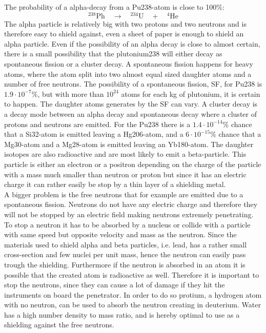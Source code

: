 The probability of a alpha-decay from a Pu238-atom is close to 100\%: 
\begin{equation}
^{238}\text{Ph} \quad \rightarrow \quad ^{234}\text{U} \quad + \quad ^4 \text{He}
\end{equation}
The alpha particle is relatively big with two protons and two neutrons and is therefore easy to shield against, even a sheet of paper is enough to shield an alpha particle\cite{website:shielding}. Even if the possibility of an alpha decay is close to almost certain, there is a small possibility that the plutonium238 will either decay as spontaneous fission or a cluster decay\cite{website:plutonium}. A spontaneous fission happens for heavy atoms, where the atom split into two almost equal sized daughter atoms and a number of free neutrons\cite{website:spontaneous_fission}. The possibility of a spontaneous fission, SF, for Pu238 is $1.9 \cdot 10^{-7}\%$, but with more than $10^{24}$ atoms for each kg of plutonium, it is certain to happen. The daughter atoms generates by the SF can vary. A cluster decay is a decay mode between an alpha decay and spontaneous decay where a cluster of protons and neutrons are emitted. For the Pu238 there is a $1.4 \cdot 10^{-14}\%$ chance that a Si32-atom is emitted leaving a Hg206-atom, and a $6 \cdot 10^{-15}\%$ chance that a Mg30-atom and a Mg28-atom is emitted leaving an Yb180-atom. The daughter isotopes are also radioactive and are most likely to emit a beta-particle. This particle is either an electron or a positron depending on the charge of the particle with a mass much smaller than neutron or proton but since it has an electric charge it can rather easily be stop by a thin layer of a shielding metal. \\

\noindent
A bigger problem is the free neutrons that for example are emitted due to a spontaneous fission.  Neutrons do not have any electric charge and therefore they will not be stopped by an electric field making neutrons extremely penetrating. To stop a neutron it has to be absorbed by a nucleus or collide with a particle with same speed but opposite velocity and mass as the neutron. Since the materials used to shield alpha and beta particles, i.e. lead, has a rather small cross-section and few nuclei per unit mass, hence the neutron can easily pass trough the shielding. Furthermore if the neutron is absorbed in an atom it is possible that the created atom is radioactive as well. Therefore it is important to stop the neutrons, since they can cause a lot of damage if they hit the instruments on board the penetrator. In order to do so protium, a hydrogen atom with no neutron, can be used to absorb the neutron creating in deuterium. Water has a high number density to mass ratio, and is hereby optimal to use as a shielding against the free neutrons.

